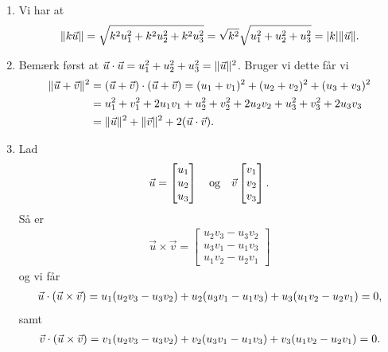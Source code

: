 \begin{enumerate}
	\item Vi har at
	\begin{align*}
	\Vert k \vec{u}\Vert=\sqrt{k^2u_1^2+k^2u_2^2+k^2u_3^2}=\sqrt{k^2}\sqrt{u_1^2+u_2^2+u_3^2}= \vert k\vert\Vert \vec{u}\Vert.
	\end{align*} 	
	\item Bemærk først at $\vec{u} \cdot \vec{u}=u_1^2+u_2^2+u_3^2=\Vert \vec{u}\Vert^2$. Bruger vi dette får vi
	\begin{align*}
	\Vert \vec{u}+\vec{v}\Vert^2&=(\vec{u}+\vec{v})\cdot (\vec{u}+\vec{v})=(u_1+v_1)^2+(u_2+v_2)^2+(u_3+v_3)^2\\&=u_1^2+v_1^2+2u_1v_1+u_2^2+v_2^2+2u_2v_2+u_3^2+v_3^2+2u_3v_3\\
	&=\Vert \vec{u}\Vert^2+\Vert \vec{v}\Vert^2+2(\vec{u}\cdot \vec{v}).
	\end{align*}
	
	\item Lad 
	\begin{align*}
	\vec{u}=\begin{bmatrix}
	u_1\\u_2\\u_3
	\end{bmatrix}
	\quad \textup{og} \quad \vec{v}\begin{bmatrix}
	v_1\\v_2\\v_3
	\end{bmatrix}.
	\end{align*}
	Så er
	\begin{align*}
	\vec{u} \times \vec{v}=\begin{bmatrix}
	u_2v_3-u_3v_2\\ u_3v_1-u_1v_3\\ u_1v_2-u_2v_1
	\end{bmatrix}
	\end{align*}
	og vi får
	\begin{align*}
	\vec{u}\cdot (\vec{u}\times \vec{v})= u_1(u_2v_3-u_3v_2)+u_2( u_3v_1-u_1v_3)+u_3(u_1v_2-u_2v_1)=0,
	\end{align*}
	samt 
	\begin{align*}
	\vec{v}\cdot (\vec{u}\times \vec{v})= v_1(u_2v_3-u_3v_2)+v_2( u_3v_1-u_1v_3)+v_3(u_1v_2-u_2v_1)=0.
	\end{align*}
\end{enumerate}